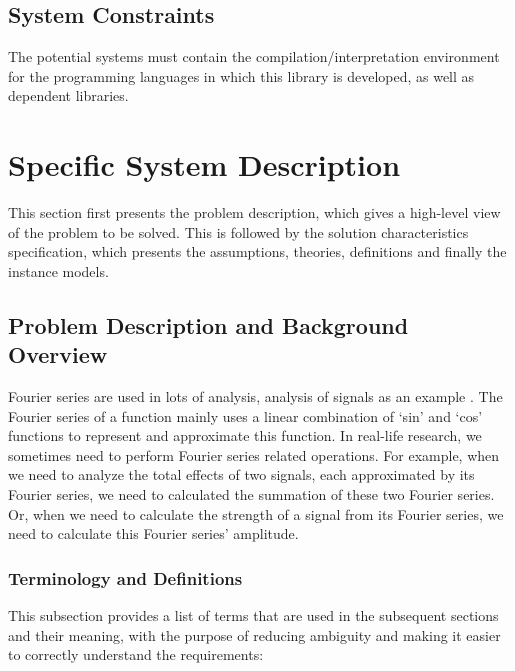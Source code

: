 \documentclass[12pt]{article}
\begin{document}
\subsection{System Constraints}

The potential systems must contain the compilation/interpretation environment 
for the programming languages in which this library is developed, as well 
as dependent libraries.

\section{Specific System Description}\label{Sc:System}

This section first presents the problem description, which gives a high-level
view of the problem to be solved.  This is followed by the solution characteristics
specification, which presents the assumptions, theories, definitions and finally
the instance models.

\subsection{Problem Description and Background Overview} \label{Sbsc:CA-Background}
Fourier series are used in lots of analysis, analysis of signals as an example 
\cite{papoulis1977signal}. The Fourier series of a function mainly uses 
a linear combination of `sin' and `cos' functions to represent and approximate 
this function. In real-life research, we sometimes need to perform Fourier 
series related operations. For example, when we need to analyze the total 
effects of two signals, each approximated by its Fourier series, 
we need to calculated the summation of these two Fourier series. 
Or, when we need to calculate the strength of a signal from its Fourier 
series, we need to calculate this Fourier series' amplitude.

\subsubsection{Terminology and  Definitions}

This subsection provides a list of terms that are used in the subsequent
sections and their meaning, with the purpose of reducing ambiguity and making it
easier to correctly understand the requirements:
\end{document}
